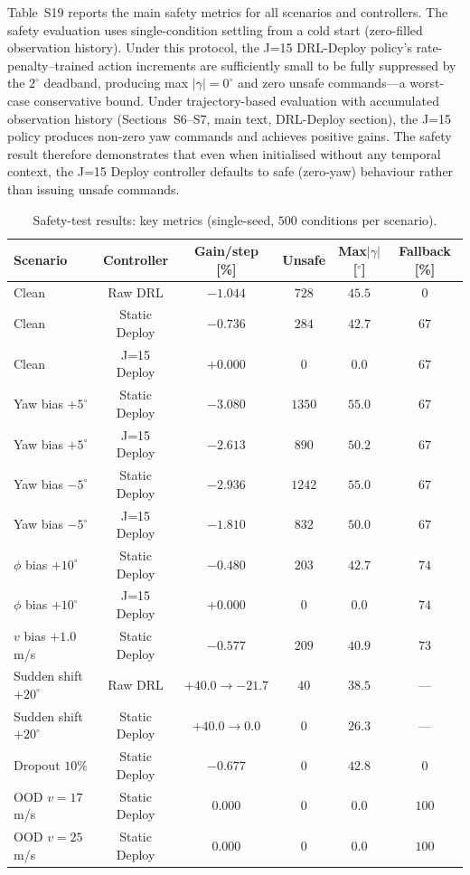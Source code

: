 \documentclass{article}
\begin{document}
Table~S19 reports the main safety metrics for all scenarios and controllers. The safety evaluation uses single-condition settling from a cold start (zero-filled observation history). Under this protocol, the J=15 DRL-Deploy policy's rate-penalty--trained action increments are sufficiently small to be fully suppressed by the $2^\circ$ deadband, producing max $|\gamma|{=}0^\circ$ and zero unsafe commands---a worst-case conservative bound. Under trajectory-based evaluation with accumulated observation history (Sections~S6--S7, main text, DRL-Deploy section), the J=15 policy produces non-zero yaw commands and achieves positive gains. The safety result therefore demonstrates that even when initialised without any temporal context, the J=15 Deploy controller defaults to safe (zero-yaw) behaviour rather than issuing unsafe commands.

\begin{table}[h]
\centering
\caption{Safety-test results: key metrics (single-seed, $500$ conditions per scenario).}
\label{tab:safety_full}
\small
\begin{tabular}{lccccc}
\toprule
Scenario & Controller & Gain/step [\%] & Unsafe & Max$|\gamma|$ [$^\circ$] & Fallback [\%] \\
\midrule
Clean       & Raw DRL        & $-1.044$ & $728$ & $45.5$ & $0$ \\
Clean       & Static Deploy  & $-0.736$ & $284$ & $42.7$ & $67$ \\
Clean       & J=15 Deploy    & $+0.000$ & $0$   & $0.0$  & $67$ \\
Yaw bias $+5^\circ$ & Static Deploy & $-3.080$ & $1350$ & $55.0$ & $67$ \\
Yaw bias $+5^\circ$ & J=15 Deploy   & $-2.613$ & $890$ & $50.2$ & $67$ \\
Yaw bias $-5^\circ$ & Static Deploy & $-2.936$ & $1242$ & $55.0$ & $67$ \\
Yaw bias $-5^\circ$ & J=15 Deploy   & $-1.810$ & $832$ & $50.0$ & $67$ \\
$\phi$ bias $+10^\circ$ & Static Deploy & $-0.480$ & $203$ & $42.7$ & $74$ \\
$\phi$ bias $+10^\circ$ & J=15 Deploy   & $+0.000$ & $0$  & $0.0$  & $74$ \\
$v$ bias ${+}1.0$\,m/s & Static Deploy & $-0.577$ & $209$ & $40.9$ & $73$ \\
Sudden shift $+20^\circ$ & Raw DRL  & $+40.0{\to}{-}21.7$ & $40$ & $38.5$ & --- \\
Sudden shift $+20^\circ$ & Static Deploy & $+40.0{\to}0.0$ & $0$ & $26.3$ & --- \\
Dropout $10\%$ & Static Deploy & $-0.677$ & $0$  & $42.8$ & $0$ \\
OOD $v{=}17$\,m/s  & Static Deploy & $0.000$ & $0$  & $0.0$  & $100$ \\
OOD $v{=}25$\,m/s  & Static Deploy & $0.000$ & $0$  & $0.0$  & $100$ \\
\bottomrule
\end{tabular}
\end{table}
\end{document}
